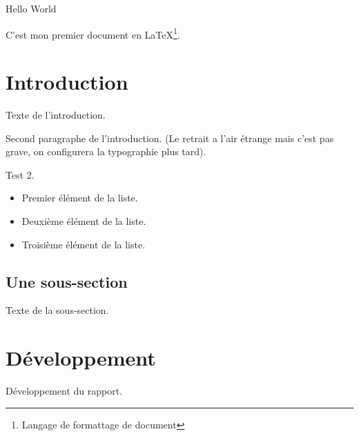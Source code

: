 \documentclass[a4paper]{report}
\begin{document}
Hello World

C'est mon premier document en LaTeX\footnote{Langage de formattage de document}.

\chapter{Introduction}

Texte de l'introduction.

Second paragraphe de l'introduction.
(Le retrait a l'air étrange mais c'est pas grave, on configurera la typographie plus tard).

Test 2.

\begin{itemize}
  \item Premier élément de la liste.
  \item Deuxième élément de la liste.
  \item Troisième élément de la liste.
\end{itemize}

\section{Une sous-section}

Texte de la sous-section.

\chapter{Développement}

Développement du rapport.
\end{document}
